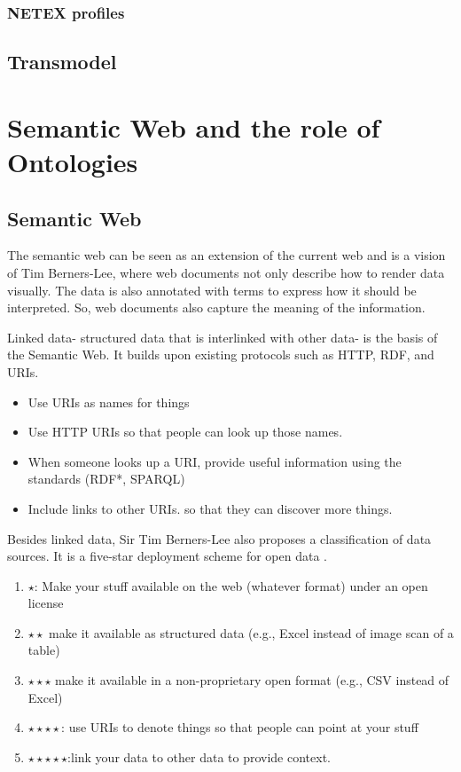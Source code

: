 \subsubsection{NETEX profiles}
\subsection{Transmodel}
\section{Semantic Web and the role of Ontologies}\label{section:ontologies_rel_work}
\subsection{Semantic Web}
The semantic web can be seen as an extension of the current web and is a vision of Tim Berners-Lee, where web documents not only describe how to render data visually. The data is also annotated with terms to express how it should be interpreted. So, web documents also capture the meaning of the information.

Linked data- structured data that is interlinked with other data- is the basis of the Semantic Web. It builds upon existing protocols such as HTTP, RDF, and URIs.

\begin{itemize}
    \item Use URIs as names for things

    \item Use HTTP URIs so that people can look up those names.

    \item When someone looks up a URI, provide useful information using the standards (RDF*, SPARQL)

    \item Include links to other URIs. so that they can discover more things.

\end{itemize}

Besides linked data, Sir Tim Berners-Lee also proposes a classification of data sources. It is a five-star deployment scheme for open data \cite{noauthor_5-star_nodate}.

\begin{enumerate}
    \item $\star$: Make your stuff available on the web (whatever format) under an open license
    \item $\star\star$ make it available as structured data (e.g., Excel instead of image scan of a table)
    \item $\star\star\star$ make it available in a non-proprietary open format (e.g., CSV instead of Excel)
    \item $\star\star\star\star$: use URIs to denote things so that people can point at your stuff
    \item $\star\star\star\star\star$:link your data to other data to provide context.
\end{enumerate}

